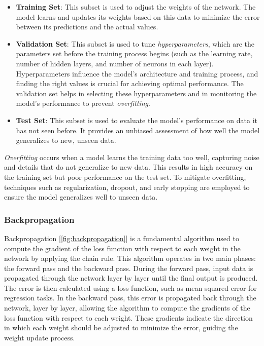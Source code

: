 \documentclass[../Thesis.tex]{subfiles}
\begin{document}
\begin{itemize}
	\item \textbf{Training Set}: This subset is used to adjust the weights of the network. The model learns and updates its weights based on this data to minimize the error between its predictions and the actual values.
	\item \textbf{Validation Set}: This subset is used to tune \emph{hyperparameters}, which are the parameters set before the training process begins (such as the learning rate, number of hidden layers, and number of neurons in each layer). Hyperparameters influence the model's architecture and training process, and finding the right values is crucial for achieving optimal performance. The validation set helps in selecting these hyperparameters and in monitoring the model’s performance to prevent \emph{overfitting}.
	\item \textbf{Test Set}: This subset is used to evaluate the model's performance on data it has not seen before. It provides an unbiased assessment of how well the model generalizes to new, unseen data.
\end{itemize}

\emph{Overfitting} occurs when a model learns the training data too well, capturing noise and details that do not generalize to new data. This results in high accuracy on the training set but poor performance on the test set. To mitigate overfitting, techniques such as regularization, dropout, and early stopping are employed to ensure the model generalizes well to unseen data.

	
	\subsubsection{Backpropagation}
	Backpropagation [\autoref{fig:backpropagation}] is a fundamental algorithm used to compute the gradient of the loss function with respect to each weight in the network by applying the chain rule. This algorithm operates in two main phases: the forward pass and the backward pass. During the forward pass, input data is propagated through the network layer by layer until the final output is produced. The error is then calculated using a loss function, such as mean squared error for regression tasks. In the backward pass, this error is propagated back through the network, layer by layer, allowing the algorithm to compute the gradients of the loss function with respect to each weight. These gradients indicate the direction in which each weight should be adjusted to minimize the error, guiding the weight update process.
	
\end{document}
